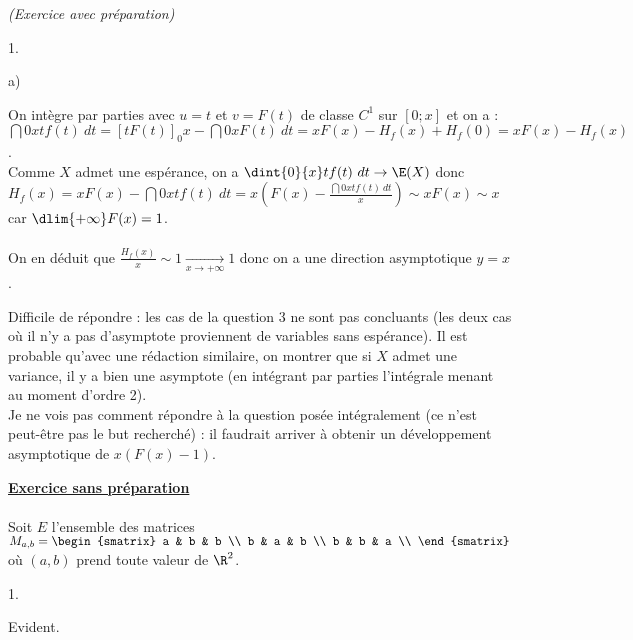 \documentclass[11pt]{article}%
\begin{document}
\begin{exercice}{\it (Exercice avec préparation)}
\begin{noliste}{1.}
\begin{noliste}{a)}
 \item On intègre par parties avec $u = t$ et $v = F(t)$ de classe
$C^{1}$ sur $[ 0 ; x]$ et on a : \\
 $\dint{0}{x} t f(t)\ dt = [ t F(t) ]_{0}{x} - \dint{0}{x} F(t)\ dt = x
F(x) - H_{f} (x) + H_{f}(0) = x F(x) - H_{f} (x)$. \\
 Comme $X$ admet une espérance, on a $\dint{0}{x} t f(t)\ dt
\rightarrow \E(X)$ donc $H_{f} (x) = x F(x) - \dint{0}{x} t f(t)\ dt =
x \left( F(x) - \frac{\dint{0}{x} t f(t)\ dt }{x} \right) \sim x F(x)
\sim x $ car $\dlim{+ \infty} F(x) = 1$.
 \\
\\
 On en déduit que $\frac{H_{f}(x) }{x } \sim 1 \xrightarrow[ x
\rightarrow + \infty]{} 1$ donc on a une direction asymptotique $y =
x$. \\
 \item Difficile de répondre : les cas de la question 3 ne sont pas
concluants (les deux cas où il n'y a pas d'asymptote proviennent de
variables sans espérance). Il est probable qu'avec une rédaction
similaire, on montrer que si $X$ admet une variance, il y a bien une
asymptote (en intégrant par parties l'intégrale menant au moment
d'ordre 2). \\
 Je ne vois pas comment répondre à la question posée intégralement (ce
n'est peut-être pas le but recherché) : il faudrait arriver à obtenir
un développement asymptotique de $x (F(x) - 1)$. \\
 \end{noliste}
 \end{noliste}
 \noindent \textbf{\underline{Exercice sans préparation}} \\
\\
 Soit $E$ l'ensemble des matrices $M_{a,b} = \begin{smatrix}
a & b & b \\
b & a & b \\
b & b & a \\
\end{smatrix}
$ où $(a,b)$ prend toute valeur de $\R^{2}$. \begin{noliste}{1.}
 \setlength{\itemsep}{4mm}
 \item Evident. \\


\end{noliste}
\end{exercice}
\end{document}
